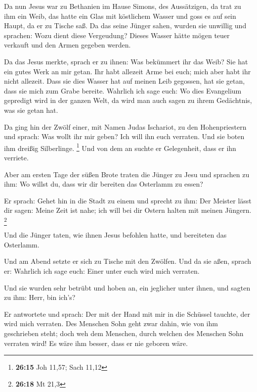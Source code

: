  Da nun Jesus war zu Bethanien im Hause Simons, des
Aussätzigen,  da trat zu ihm ein Weib, das hatte ein Glas
mit köstlichem Wasser und goss es auf sein Haupt, da er zu Tische saß.
 Da das seine Jünger sahen, wurden sie unwillig und
sprachen: Wozu dient diese Vergeudung?  Dieses Wasser
hätte mögen teuer verkauft und den Armen gegeben werden.

 Da das Jesus merkte, sprach er zu ihnen: Was bekümmert
ihr das Weib? Sie hat ein gutes Werk an mir getan.  Ihr
habt allezeit Arme bei euch; mich aber habt ihr nicht allezeit.
 Dass sie dies Wasser hat auf meinen Leib gegossen, hat
sie getan, dass sie mich zum Grabe bereite.  Wahrlich ich
sage euch: Wo dies Evangelium gepredigt wird in der ganzen Welt, da wird
man auch sagen zu ihrem Gedächtnis, was sie getan hat.

 Da ging hin der Zwölf einer, mit Namen Judas Ischariot,
zu den Hohenpriestern  und sprach: Was wollt ihr mir
geben? Ich will ihn euch verraten. Und sie boten ihm dreißig
Silberlinge. \footnote{\textbf{26:15} Joh 11,57; Sach 11,12}
 Und von dem an suchte er Gelegenheit, dass er ihn
verriete.

 Aber am ersten Tage der süßen Brote traten die Jünger zu
Jesu und sprachen zu ihm: Wo willst du, dass wir dir bereiten das
Osterlamm zu essen?

 Er sprach: Gehet hin in die Stadt zu einem und sprecht
zu ihm: Der Meister lässt dir sagen: Meine Zeit ist nahe; ich will bei
dir Ostern halten mit meinen Jüngern. \footnote{\textbf{26:18} Mt 21,3}

 Und die Jünger taten, wie ihnen Jesus befohlen hatte,
und bereiteten das Osterlamm.

 Und am Abend setzte er sich zu Tische mit den Zwölfen.
 Und da sie aßen, sprach er: Wahrlich ich sage euch:
Einer unter euch wird mich verraten.

 Und sie wurden sehr betrübt und hoben an, ein jeglicher
unter ihnen, und sagten zu ihm: Herr, bin ich's?

 Er antwortete und sprach: Der mit der Hand mit mir in
die Schüssel tauchte, der wird mich verraten.  Des
Menschen Sohn geht zwar dahin, wie von ihm geschrieben steht; doch weh
dem Menschen, durch welchen des Menschen Sohn verraten wird! Es wäre ihm
besser, dass er nie geboren wäre.

